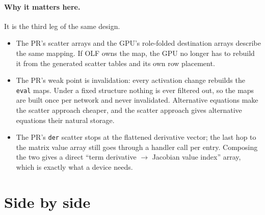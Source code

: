 \documentclass[11pt,a4paper]{article}
\newcommand{\code}[1]{\texttt{\small #1}}
\begin{document}
\paragraph{Why it matters here.} It is the third leg of the same design.
\begin{itemize}
\item The PR's scatter arrays and the GPU's role-folded destination arrays describe the
      same mapping. If OLF owns the map, the GPU no longer has to rebuild it from the
      generated scatter tables and its own row placement.
\item The PR's weak point is invalidation: every activation change rebuilds the
      \code{eval} maps. Under a fixed structure nothing is ever filtered out, so the maps
      are built once per network and never invalidated. Alternative equations make the
      scatter approach cheaper, and the scatter approach gives alternative equations
      their natural storage.
\item The PR's \code{der} scatter stops at the flattened derivative vector; the last hop
      to the matrix value array still goes through a handler call per entry. Composing
      the two gives a direct ``term derivative $\to$ Jacobian value index'' array, which
      is exactly what a device needs.
\end{itemize}

\section{Side by side}
\end{document}
